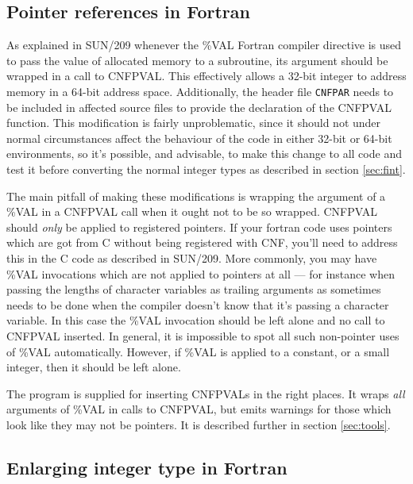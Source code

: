 \documentclass[twoside,11pt]{article}
\newcommand{\xref}[3]{#1}
\renewcommand{\_}{\texttt{\symbol{95}}}
\begin{document}
\subsection{Pointer references in Fortran}

As explained in \xref{SUN/209}{sun209}{pointers} 
whenever the \%VAL Fortran compiler directive 
is used to pass the value of allocated
memory to a subroutine, its argument should be wrapped in a call
to \xref{CNF\_PVAL}{sun209}{CNF\_PVAL}.  This effectively allows
a 32-bit integer to address memory in a 64-bit address space.
Additionally, the header file {\tt CNF\_PAR} needs to be included
in affected source files to provide the declaration of the CNF\_PVAL 
function.
This modification is fairly unproblematic, 
since it should not under normal
circumstances affect the behaviour of the code in either 32-bit or
64-bit environments, so it's possible, and advisable, to make this
change to all code and test it before converting the normal integer types
as described in section \ref{sec:fint}.  

The main pitfall of making these modifications is
wrapping the argument of a \%VAL in a CNF\_PVAL call when it ought
not to be so wrapped.
CNF\_PVAL should {\em only\/} be applied to registered pointers.
If your fortran code uses pointers which are got from C without 
being registered with CNF, you'll need to address this in the C code 
as described in \xref{SUN/209}{sun209}{pointers}.
More commonly, you may have \%VAL invocations which are not
applied to pointers at all --- for instance when passing 
the lengths of character variables as trailing arguments 
as sometimes needs to be done when the compiler doesn't know that
it's passing a character variable.  In this case the \%VAL 
invocation should be left alone and no call to CNF\_PVAL inserted.
In general, it is impossible to spot all such non-pointer uses
of \%VAL automatically.  However, if \%VAL is applied to a constant,
or a small integer, then it should be left alone.

The program  is supplied for inserting CNF\_PVALs
in the right places.  It wraps {\em all\/} arguments of \%VAL 
in calls to CNF\_PVAL, but emits warnings for those which look like
they may not be pointers.  It is described further in section 
\ref{sec:tools}.


\subsection{Enlarging integer type in Fortran\label{sec:fint}}
\end{document}
